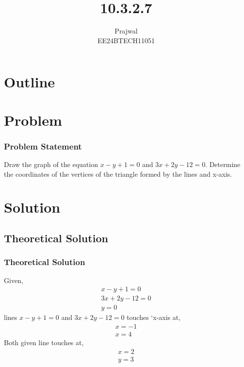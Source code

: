 \documentclass{beamer}
\title{10.3.2.7}
\author{Prajwal \\ EE24BTECH11051}
\theoremstyle{remark}
\numberwithin{equation}{section}
\begin{document}
\begin{frame}
\titlepage
\end{frame}
\section*{Outline}
\begin{frame}
\tableofcontents
\end{frame}
\section{Problem}
\begin{frame}
\frametitle{Problem Statement}
Draw the graph of the equation $x − y + 1 = 0$ and $3x + 2y − 12 = 0$. Determine the coordinates of the vertices of the triangle formed by the lines and x-axis.
\end{frame}
\section{Solution}
\subsection{Theoretical Solution}
\begin{frame}
\frametitle{Theoretical Solution}
Given,
\begin{align}
x-y+1=0\\
3x+2y-12=0\\
y=0
\end{align}
lines $x-y+1=0$ and $3x+2y-12=0$ touches `x-axis at,
\begin{align}
    x=-1\\
    x=4
\end{align}
Both given line touches at,
\begin{align}
    x=2\\
    y=3
\end{align}
\end{frame}
\end{document}
